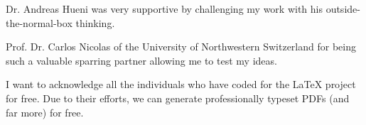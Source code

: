 Dr. Andreas Hueni was very supportive by challenging my work with his outside-the-normal-box thinking.

Prof. Dr. Carlos Nicolas of the University of Northwestern Switzerland for being such a valuable sparring partner allowing me to test my ideas.

I want to acknowledge all the individuals who have coded for the \LaTeX{} project for free. Due to their efforts, we can generate professionally typeset PDFs (and far more) for free.






